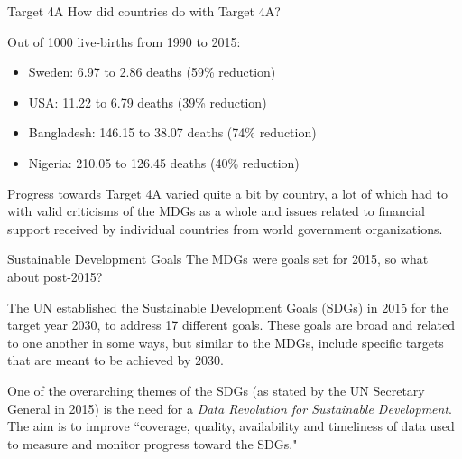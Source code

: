 \documentclass[10pt,t]{beamer}
\begin{document}
\begin{frame}{Target 4A}
How did countries do with Target 4A?

\vspace{0.3cm}

Out of 1000 live-births from 1990 to 2015:

\vspace{0.3cm}

\begin{itemize}
	\item Sweden: 6.97 to 2.86 deaths (59\% reduction)
	\item USA: 11.22 to 6.79 deaths (39\% reduction)
	\item Bangladesh: 146.15 to 38.07 deaths (74\% reduction)
	\item Nigeria: 210.05 to 126.45 deaths (40\% reduction)
\end{itemize}

\vspace{0.3cm} 

Progress towards Target 4A varied quite a bit by country, a lot of which had to with valid criticisms of the MDGs as a whole and issues related to financial support received by individual countries from world government organizations.

\end{frame}

\begin{frame}{Sustainable Development Goals}
The MDGs were goals set for 2015, so what about post-2015? 
\vspace{0.3cm}

The UN established the Sustainable Development Goals (SDGs) in 2015 for the target year 2030, to address 17 different goals. These goals are broad and related to one another in some ways, but similar to the MDGs, include specific targets that are meant to be achieved by 2030.

\vspace{0.3cm}

One of the overarching themes of the SDGs (as stated by the UN Secretary General in 2015) is the need for a \textit{Data Revolution for Sustainable Development}. The aim is to improve ``coverage, quality, availability and timeliness of data used to measure and monitor progress toward the SDGs."

\end{frame}
\end{document}
